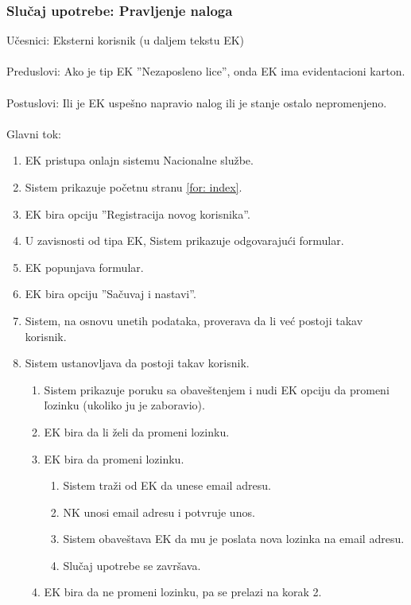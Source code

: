 \subsubsection{Slu\v caj upotrebe: Pravljenje naloga}
\label{su: pravljenje naloga}

\noindent U\v cesnici: Eksterni korisnik (u daljem tekstu EK)
\\
\\ Preduslovi: Ako je tip EK ''Nezaposleno lice'', onda EK ima evidentacioni karton.
\\
\\ Postuslovi: Ili je EK uspe\v sno napravio nalog ili je stanje ostalo nepromenjeno.
\\ 
\\ Glavni tok:
\begin{enumerate}
	\item EK pristupa onlajn sistemu Nacionalne slu\v zbe.
	\item Sistem prikazuje po\v cetnu stranu \ref{for: index}.
	\item EK bira opciju ''Registracija novog korisnika''.
	\item U zavisnosti od tipa EK, Sistem prikazuje odgovaraju\' ci formular.
	\item EK popunjava formular.
	\item EK bira opciju ''Sa\v cuvaj i nastavi''.
	\item Sistem, na osnovu unetih podataka, proverava da li ve\'c postoji takav korisnik.
	\item Sistem ustanovljava da postoji takav korisnik.
	\begin{enumerate}
		\item Sistem prikazuje poruku sa obave\v stenjem i nudi EK opciju da promeni \v lozinku (ukoliko ju je zaboravio).
		\item EK bira da li \v zeli da promeni lozinku.
		\item EK bira da promeni lozinku.
		\begin{enumerate}
			\item Sistem tra\v zi od EK da unese email adresu.
			\item NK unosi email adresu i potvr\dj uje unos.
			\item Sistem obave\v stava EK da mu je poslata nova lozinka na email adresu.
			\item Slu\v caj upotrebe se zavr\v sava.
		\end{enumerate}
		\item EK bira da ne promeni lozinku, pa se prelazi na korak 2.

\end{enumerate}
\end{enumerate}
